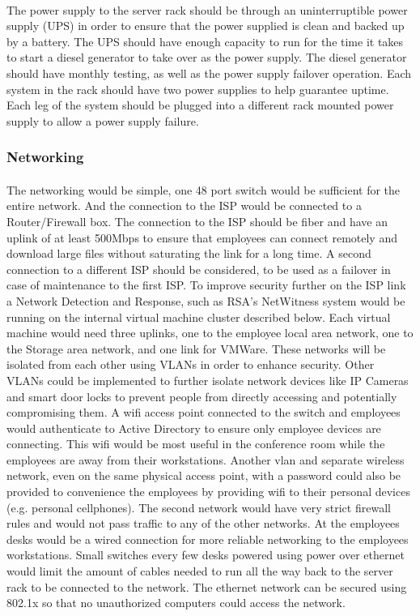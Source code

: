 \documentclass{article}
\begin{document}
\paragraph{}
The power supply to the server rack should be through an uninterruptible power supply (UPS) in order to ensure that the power supplied is clean and backed up by a battery.
The UPS should have enough capacity to run for the time it takes to start a diesel generator to take over as the power supply.
The diesel generator should have monthly testing, as well as the power supply failover operation.
Each system in the rack should have two power supplies to help guarantee uptime.
Each leg of the system should be plugged into a different rack mounted power supply to allow a power supply failure.
 
\subsubsection{Networking}
\paragraph{}
The networking would be simple, one 48 port switch would be sufficient for the entire network.
And the connection to the ISP would be connected to a Router/Firewall box.
The connection to the ISP should be fiber and have an uplink of at least 500Mbps to ensure that employees can connect remotely and download large files without saturating the link for a long time.
A second connection to a different ISP should be considered, to be used as a failover in case of maintenance to the first ISP.
To improve security further on the ISP link a Network Detection and Response, such as RSA's NetWitness system would be running on the internal virtual machine cluster described below.
Each virtual machine would need three uplinks, one to the employee local area network, one to the Storage area network, and one link for VMWare.
These networks will be isolated from each other using VLANs in order to enhance security.
Other VLANs could be implemented to further isolate network devices like IP Cameras and smart door locks to prevent people from directly accessing and potentially compromising them.
A wifi access point connected to the switch and employees would authenticate to Active Directory to ensure only employee devices are connecting.
This wifi would be most useful in the conference room while the employees are away from their workstations.
Another vlan and separate wireless network, even on the same physical access point, with a password could also be provided to convenience the employees by providing wifi to their personal devices (e.g. personal cellphones).
The second network would have very strict firewall rules and would not pass traffic to any of the other networks.
At the employees desks would be a wired connection for more reliable networking to the employees workstations. 
Small switches every few desks powered using power over ethernet would limit the amount of cables needed to run all the way back to the server rack to be connected to the network.
The ethernet network can be secured using 802.1x so that no unauthorized computers could access the network. 
\end{document}
